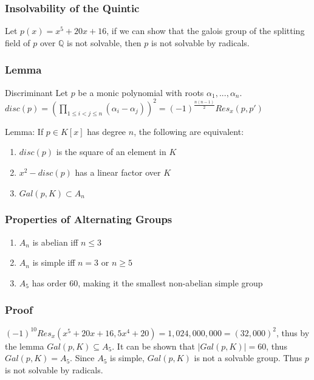 \documentclass{beamer}
\begin{document}
  \begin{frame}
\frametitle{Insolvability of the Quintic}
Let $p(x)=x^5+20x+16$, if we can show that the galois group of the splitting field of $p$ over $\mathbb{Q}$ is not solvable, then $p$ is not solvable by radicals.
 \end{frame}
 
   \begin{frame}
\frametitle{Lemma}
\begin{block}{Discriminant}
Let $p$ be a monic polynomial with roots $\alpha_1,...,\alpha_n$. $disc(p) = (\displaystyle \prod_{1 \leq i < j \leq n} (\alpha_i - \alpha_j))^2 =(-1)^{\frac{n(n-1)}{2}} Res_x(p,p')$
\end{block}

Lemma: If $p \in K[x]$ has degree $n$, the following are equivalent: 
\begin{enumerate}
\item  $disc(p)$ is the square of an element in $K$
\item $x^2-disc(p)$ has a linear factor over $K$
\item $Gal(p,K) \subset A_n$
\end{enumerate}
 \end{frame}
 
   \begin{frame}
\frametitle{Properties of Alternating Groups}
\begin{enumerate}
\item  $A_n$ is abelian iff $n \leq 3$\\
\item $A_n$ is simple iff $n=3$ or $n \geq 5$
\item $A_5$ has order 60, making it the smallest non-abelian simple group
\end{enumerate}
 \end{frame}
 
 \begin{frame}
 \frametitle{Proof}
 $(-1)^{10}Res_x(x^5+20x+16, 5x^4+20)=1,024,000,000=(32,000)^2$, thus by the lemma $Gal(p,K) \subseteq A_5$. It can be shown that $|Gal(p,K)| = 60$, thus $Gal(p,K) = A_5$. Since $A_5$ is simple, $Gal(p, K)$ is not a solvable group. Thus $p$ is not solvable by radicals. 
 \end{frame}
 
\end{document}

